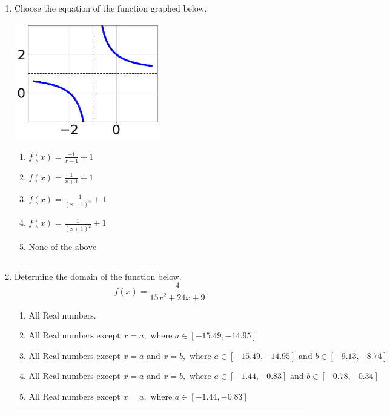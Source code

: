 \documentclass[14pt]{extbook}
\newcommand{\litem}[1]{\item#1\hspace*{-1cm}\rule{\textwidth}{0.4pt}}
\begin{document}
\begin{enumerate}
{\begin{enumerate}[label=\Alph*.]
\end{enumerate} }
\litem{
Choose the equation of the function graphed below.
\begin{center}
    \includegraphics[width=0.5\textwidth]{../Figures/rationalGraphToEquationB.png}
\end{center}
\begin{enumerate}[label=\Alph*.]
\item \( f(x) = \frac{-1}{x - 1} + 1 \)
\item \( f(x) = \frac{1}{x + 1} + 1 \)
\item \( f(x) = \frac{-1}{(x - 1)^2} + 1 \)
\item \( f(x) = \frac{1}{(x + 1)^2} + 1 \)
\item \( \text{None of the above} \)

\end{enumerate} }
\litem{
Determine the domain of the function below.\[ f(x) = \frac{4}{15x^{2} +24 x + 9} \]\begin{enumerate}[label=\Alph*.]
\item \( \text{All Real numbers.} \)
\item \( \text{All Real numbers except } x = a, \text{ where } a \in [-15.49, -14.95] \)
\item \( \text{All Real numbers except } x = a \text{ and } x = b, \text{ where } a \in [-15.49, -14.95] \text{ and } b \in [-9.13, -8.74] \)
\item \( \text{All Real numbers except } x = a \text{ and } x = b, \text{ where } a \in [-1.44, -0.83] \text{ and } b \in [-0.78, -0.34] \)
\item \( \text{All Real numbers except } x = a, \text{ where } a \in [-1.44, -0.83] \)


\end{enumerate}}
\end{enumerate}
\end{document}
